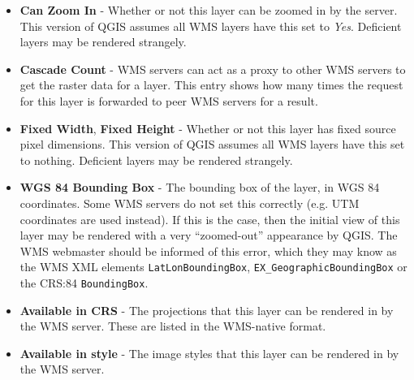 \begin{itemize}[label=--]
\begin{itemize}[label=--]
\item \textbf{Can Zoom In}      - Whether or not this layer can be zoomed in by the server.  This version
                                  of QGIS assumes all WMS layers have this set to \textsl{Yes}.
                                  Deficient layers may be rendered strangely.

\item \textbf{Cascade Count}    - WMS servers can act as a proxy to other WMS servers to get
                                  the raster data for a layer.  This entry shows how
                                  many times the request for this layer is forwarded to peer
                                  WMS servers for a result.

\item \textbf{Fixed Width}, \textbf{Fixed Height}
                                - Whether or not this layer has fixed source pixel dimensions.
                                  This version
                                  of QGIS assumes all WMS layers have this set to nothing.
                                  Deficient layers may be rendered strangely.

\item \textbf{WGS 84 Bounding Box} - The bounding box of the layer, in WGS 84 coordinates.
                                     Some WMS servers do not set this correctly (e.g. UTM
                                     coordinates are used instead).  If this is the case,
                                     then the initial view of this layer may be rendered
                                     with a very ``zoomed-out'' appearance by QGIS.
                                     The WMS webmaster should be informed of this error,
                                     which they may know as the WMS XML elements
                                     \texttt{LatLonBoundingBox},
                                     \texttt{EX\_GeographicBoundingBox} or
                                     the CRS:84 \texttt{BoundingBox}.

\item \textbf{Available in CRS} - The projections that this layer can be rendered in by
                                  the WMS server.  These are listed in the WMS-native format.

\item \textbf{Available in style} - The image styles that this layer can be rendered in by
                                    the WMS server.

\end{itemize}

\end{itemize}


